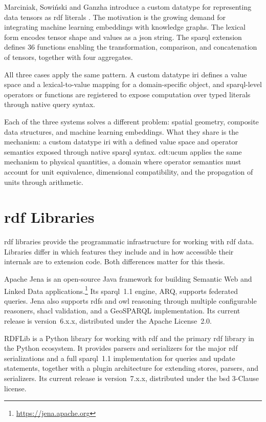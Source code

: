 Marciniak, Sowiński and Ganzha introduce a custom datatype for representing data tensors as
\ac{rdf} literals \cite{marciniak2025representing}. The motivation is the growing demand for
integrating machine learning embeddings with knowledge graphs. The lexical form encodes
tensor shape and values as a \ac{json} string. The \ac{sparql} extension defines 36
functions enabling the transformation, comparison, and concatenation of tensors, together
with four aggregates.

All three cases apply the same pattern. A custom datatype \ac{iri} defines a value space and
a lexical-to-value mapping for a domain-specific object, and \ac{sparql}-level operators or
functions are registered to expose computation over typed literals through native query
syntax.

Each of the three systems solves a different problem: spatial geometry, composite data
structures, and machine learning embeddings. What they share is the mechanism: a custom
datatype \ac{iri} with a defined value space and operator semantics exposed through
native \ac{sparql} syntax. \textsf{cdt:ucum} applies the same mechanism to physical quantities, a domain where
operator semantics must account for unit equivalence, dimensional compatibility, and
the propagation of units through arithmetic.


\section{\ac{rdf} Libraries}

\ac{rdf} libraries provide the programmatic infrastructure for working with \ac{rdf} data.
Libraries differ in which features they include and in how accessible their internals are
to extension code. Both differences matter for this thesis.

Apache Jena is an open-source Java framework for building Semantic Web and Linked Data
applications.\footnote{\url{https://jena.apache.org}} Its \ac{sparql}~1.1 engine, ARQ,
supports federated queries. Jena also supports \ac{rdfs} and \ac{owl} reasoning through
multiple configurable reasoners, \ac{shacl} validation, and a GeoSPARQL implementation.
Its current release is version~6.x.x, distributed under the Apache License~2.0.

RDFLib is a Python library for working with \ac{rdf} and the primary \ac{rdf} library in
the Python ecosystem. It provides parsers and serializers for the major \ac{rdf}
serializations and a full \ac{sparql}~1.1 implementation for queries and update statements,
together with a plugin architecture for extending stores, parsers, and serializers. Its
current release is version~7.x.x, distributed under the \ac{bsd} 3-Clause license.

